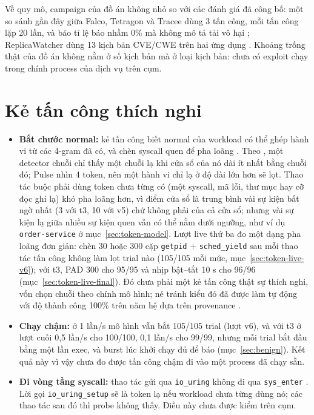 Về quy mô, campaign của đồ án không nhỏ so với các đánh giá đã công bố: một so sánh gần đây giữa Falco, Tetragon và Tracee dùng 3 tấn công, mỗi tấn công lặp 20 lần, và báo tỉ lệ báo nhầm 0\% mà không mô tả tải vô hại \citep{syairozi2025}; ReplicaWatcher dùng 13 kịch bản CVE/CWE trên hai ứng dụng \citep{elkhairi2024}. Khoảng trống thật của đồ án không nằm ở số kịch bản mà ở loại kịch bản: chưa có exploit chạy trong chính process của dịch vụ trên cụm.

\section{Kẻ tấn công thích nghi}\label{sec:limits-adaptive}

\begin{itemize}
\tightlist
\item
  \textbf{Bắt chước normal:} kẻ tấn công biết normal của workload có thể ghép hành vi từ các 4-gram đã có, và chèn syscall quen để pha loãng \citep{wagner2002}. Theo \citet{tan2002}, một detector chuỗi chỉ thấy một chuỗi lạ khi cửa sổ của nó dài ít nhất bằng chuỗi đó; Pulse nhìn 4 token, nên một hành vi chỉ lạ ở độ dài lớn hơn sẽ lọt. Thao tác buộc phải dùng token chưa từng có (một syscall, mã lỗi, thư mục hay cỡ đọc ghi lạ) khó pha loãng hơn, vì điểm cửa sổ là trung bình vài sự kiện bất ngờ nhất (3 với t3, 10 với v5) chứ không phải của cả cửa sổ; nhưng vài sự kiện lạ giữa nhiều sự kiện quen vẫn có thể nằm dưới ngưỡng, như ví dụ \texttt{order-\allowbreak{}service} ở mục~\ref{sec:token-model}. Lượt live thứ ba đo một dạng pha loãng đơn giản: chèn 30 hoặc 300 cặp \texttt{getpid} + \texttt{sched\_\allowbreak{}yield} sau mỗi thao tác tấn công không làm lọt trial nào (105/105 mỗi mức, mục~\ref{sec:token-live-v6}); với t3, PAD 300 cho 95/95 và nhịp bật--tắt 10 s cho 96/96 (mục~\ref{sec:token-live-final}). Đó chưa phải một kẻ tấn công thật sự thích nghi, vốn chọn chuỗi theo chính mô hình; né tránh kiểu đó đã được làm tự động với độ thành công 100\% trên năm hệ dựa trên provenance \citep{goyal2023}.
\item
  \textbf{Chạy chậm:} ở 1 lần/s mô hình vẫn bắt 105/105 trial (lượt v6), và với t3 ở lượt cuối 0,5 lần/s cho 100/100, 0,1 lần/s cho 99/99, nhưng mỗi trial bắt đầu bằng một lần exec, và burst lúc khởi chạy đủ để báo (mục~\ref{sec:benign}). Kết quả này vì vậy chưa đo được tấn công chậm đi vào một process đã chạy sẵn.
\item
  \textbf{Đi vòng tầng syscall:} thao tác gửi qua \texttt{io\_\allowbreak{}uring} không đi qua \texttt{sys\_\allowbreak{}enter} \citep{armo2025}. Lời gọi \texttt{io\_\allowbreak{}uring\_\allowbreak{}setup} sẽ là token lạ nếu workload chưa từng dùng nó; các thao tác sau đó thì probe không thấy. Điều này chưa được kiểm trên cụm.
\end{itemize}

